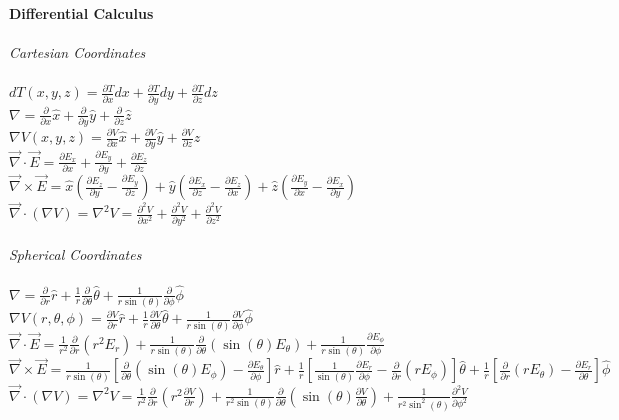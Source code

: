 \documentclass[12pt]{article}
\newcommand{\ds}{\displaystyle}
\begin{document}
\begin{flushleft}
\textbf{Differential Calculus}\\~\\
\textit{Cartesian Coordinates}\\~\\

$\ds dT(x,y,z)=\frac{\partial T}{\partial x}dx+\frac{\partial T}{\partial y}dy+\frac{\partial T}{\partial z}dz$\\
$\ds \nabla=\frac{\partial}{\partial x}\hat{x}+\frac{\partial}{\partial y}\hat{y}+\frac{\partial}{\partial z}\hat{z}$\\
$\ds \nabla V(x,y,z)=\frac{\partial V}{\partial x}\hat{x}+\frac{\partial V}{\partial y}\hat{y}+\frac{\partial V}{\partial z}\hat{z}$\\
$\ds \vec{\nabla}\cdot\vec{E}=\frac{\partial E_x}{\partial x}+\frac{\partial E_y}{\partial y}+\frac{\partial E_z}{\partial z}$\\
$\ds \vec{\nabla}\times\vec{E}=\hat{x}(\frac{\partial E_z}{\partial y}-\frac{\partial E_y}{\partial z})+\hat{y}(\frac{\partial E_x}{\partial z}-\frac{\partial E_z}{\partial x})+\hat{z}(\frac{\partial E_y}{\partial x}-\frac{\partial E_x}{\partial y})$\\
$\ds\vec{\nabla}\cdot(\nabla V)=\nabla^2V=\frac{\partial^2 V}{\partial x^2}+\frac{\partial^2 V}{\partial y^2}+\frac{\partial^2 V}{\partial z^2}$\\~\\

\textit{Spherical Coordinates}\\~\\
$\ds \nabla=\frac{\partial}{\partial r}\hat{r}+\frac{1}{r}\frac{\partial}{\partial\theta}\hat{\theta}+\frac{1}{r\sin(\theta)}\frac{\partial}{\partial\phi}\hat{\phi}$\\
$\ds \nabla V(r,\theta,\phi)=\frac{\partial V}{\partial r}\hat{r}+\frac{1}{r}\frac{\partial V}{\partial\theta}\hat{\theta}+\frac{1}{r\sin(\theta)}\frac{\partial V}{\partial\phi}\hat{\phi}$\\
$\ds \vec{\nabla}\cdot \vec{E}=\frac{1}{r^2}\frac{\partial }{\partial r}(r^2E_r)+\frac{1}{r\sin(\theta)}\frac{\partial }{\partial\theta}(\sin(\theta)E_\theta)+\frac{1}{r\sin(\theta)}\frac{\partial E_\phi}{\partial\phi}$\\
$\ds \vec{\nabla}\times\vec{E}=\frac{1}{r\sin(\theta)}\left[\frac{\partial}{\partial \theta}(\sin(\theta)E_\phi)-\frac{\partial E_\theta}{\partial \phi}\right]\hat{r}+\frac{1}{r}\left[\frac{1}{\sin(\theta)}\frac{\partial E_r}{\partial \phi}-\frac{\partial}{\partial r}(rE_\phi)\right]\hat{\theta}+\frac{1}{r}\left[\frac{\partial}{\partial r}(rE_\theta)-\frac{\partial E_r}{\partial \theta}\right]\hat{\phi}$\\
$\ds \vec{\nabla}\cdot(\nabla V)=\nabla^2V=\frac{1}{r^2}\frac{\partial}{\partial r}\left(r^2\frac{\partial V}{\partial r}\right)+\frac{1}{r^2\sin(\theta)}\frac{\partial}{\partial \theta}\left(\sin(\theta)\frac{\partial V}{\partial \theta}\right)+\frac{1}{r^2\sin^2(\theta)}\frac{\partial^2 V}{\partial \phi^2}$\\~\\


\end{flushleft}
\end{document}
